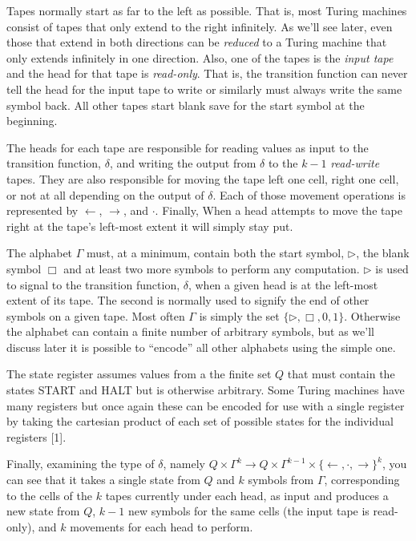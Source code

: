 \documentclass[usletter]{article}
\begin{document}
Tapes normally start as far to the left as possible. That is, most Turing machines consist of tapes that only extend to the right infinitely. As we'll see later, even those that extend in both directions can be \textit{reduced} to a Turing machine that only extends infinitely in one direction. Also, one of the tapes is the \textit{input tape} and the head for that tape is \textit{read-only}. That is, the transition function can never tell the head for the input tape to write or similarly must always write the same symbol back. All other tapes start blank save for the start symbol at the beginning.

The heads for each tape are responsible for reading values as input to the transition function, $\delta$, and writing the output from $\delta$ to the $k-1$ \textit{read-write} tapes. They are also responsible for moving the tape left one cell, right one cell, or not at all depending on the output of $\delta$. Each of those movement operations is represented by $\leftarrow$, $\rightarrow$, and $\cdot$. Finally, When a head attempts to move the tape right at the tape's left-most extent it will simply stay put.

The alphabet $\Gamma$ must, at a minimum, contain both the start symbol, $\rhd$, the blank symbol $\Box$ and at least two more symbols to perform any computation. $\rhd$ is used to signal to the transition function, $\delta$, when a given head is at the left-most extent of its tape. The second is normally used to signify the end of other symbols on a given tape. Most often $\Gamma$ is simply the set $\{\rhd, \Box, 0, 1\}$. Otherwise the alphabet can contain a finite number of arbitrary symbols, but as we'll discuss later it is possible to ``encode'' all other alphabets using the simple one.

The state register assumes values from a the finite set $Q$ that must contain the states \textsf{START} and \textsf{HALT} but is otherwise arbitrary. Some Turing machines have many registers but once again these can be encoded for use with a single register by taking the cartesian product of each set of possible states for the individual registers [1].

Finally, examining the type of $\delta$, namely $Q \times \Gamma^{k} \rightarrow Q \times \Gamma^{k-1} \times \{\leftarrow, \cdot, \rightarrow\} ^k$, you can see that it takes a single state from $Q$ and $k$ symbols from $\Gamma$, corresponding to the cells of the $k$ tapes currently under each head, as input and produces a new state from $Q$, $k-1$ new symbols for the same cells (the input tape is read-only), and $k$ movements for each head to perform.
\end{document}
